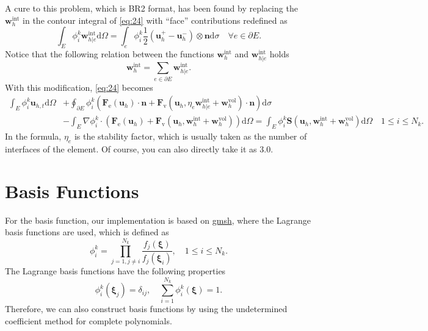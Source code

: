 \documentclass{develop-note}
\begin{document}
A cure to this problem, which is BR2 format, has been found by replacing the $\mathbf{w}_{h}^{\mathrm{int}}$ in the contour integral of \autoref{eq:24} with ``face'' contributions redefined as
\begin{equation}
  \int_{E}\phi_{i}^{k}\mathbf{w}_{h|e}^{\mathrm{int}}\mathrm{d}\Omega=\int_{e}\phi_{i}^{k}\dfrac{1}{2}(\mathbf{u}_{h}^{+}-\mathbf{u}_{h}^{-})\otimes\mathbf{n}\mathrm{d}\sigma\quad\forall e \in\partial E.
\end{equation}
Notice that the following relation between the functions $\mathbf{w}_{h}^{\mathrm{int}}$ and $\mathbf{w}_{h|e}^{\mathrm{int}}$ holds
\begin{equation}
  \mathbf{w}_{h}^{\mathrm{int}}=\sum_{e\in\partial E}\mathbf{w}_{h|e}^{\mathrm{int}}.
\end{equation}
With this modification, \autoref{eq:24} becomes
\begin{equation}
  \begin{aligned}
    \int_{E}\phi_{i}^{k}\mathbf{u}_{h,t}\mathrm{d}\Omega &+\oint_{\partial E}\phi_{i}^{k}(\mathbf{F}_{\mathrm{e}}(\mathbf{u}_{h})\cdot\mathbf{n}+\mathbf{F}_{\mathrm{v}}(\mathbf{u}_{h},\eta_{e}\mathbf{w}_{h|e}^{\mathrm{int}}+\mathbf{w}_{h}^{\mathrm{vol}})\cdot\mathbf{n})\mathrm{d}\sigma\\
    &-\int_{E}\nabla\phi_{i}^{k}\cdot(\mathbf{F}_{\mathrm{e}}(\mathbf{u}_{h})+\mathbf{F}_{\mathrm{v}}(\mathbf{u}_{h},\mathbf{w}_{h}^{\mathrm{int}}+\mathbf{w}_{h}^{\mathrm{vol}}))\mathrm{d}\Omega=\int_{E}\phi_{i}^{k}\mathbf{S}(\mathbf{u}_{h},\mathbf{w}_{h}^{\mathrm{int}}+\mathbf{w}_{h}^{\mathrm{vol}})\mathrm{d}\Omega\quad 1\leqslant i\leqslant N_{k}.
  \end{aligned}
\end{equation}
In the formula, $\eta_{e}$ is the stability factor, which is usually taken as the number of interfaces of the element. Of course, you can also directly take it as $3.0$.

\section{Basis Functions}

For the basis function, our implementation is based on \href{https://gmsh.info}{gmsh}, where the Lagrange basis functions are used, which is defined as
\begin{equation}
  \phi_{i}^{k}=\prod_{j=1,j\neq i}^{N_{k}}\dfrac{f_{j}(\bm{\xi})}{f_{j}(\bm{\xi}_{i})},\quad 1\leqslant i\leqslant N_{k}.
\end{equation}
The Lagrange basis functions have the following properties
\begin{equation}
  \phi_{i}^{k}(\bm{\xi}_{j})=\delta_{ij},\quad \sum_{i=1}^{N_{k}}\phi_{i}^{k}(\bm{\xi})=1.
\end{equation}
Therefore, we can also construct basis functions by using the undetermined coefficient method for complete polynomials.
\end{document}
